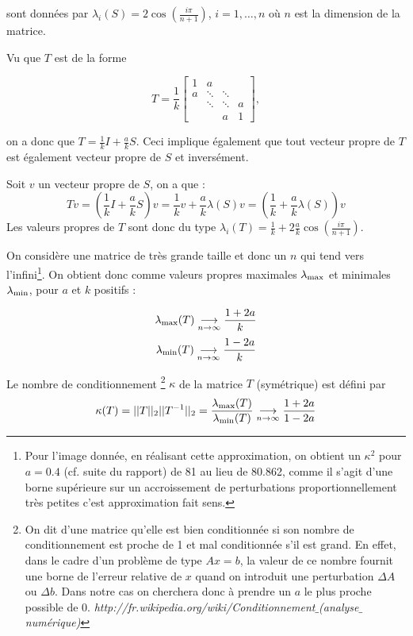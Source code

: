 sont données par $\lambda_i(S) = 2 \cos(\frac{i\pi}{n+1})$, $i= 1, \ldots , n$ où $n$ est la dimension de la matrice.

Vu que $T$ est de la forme

$$
 T = \frac{1}{k}
 \begin{bmatrix}
    1 & a 		& 			& \\
    a & \ddots 	& \ddots 	& \\
      & \ddots 	& \ddots 	& a \\
      & 		& a			& 1
  \end{bmatrix},
$$

on a donc que $T = \frac{1}{k} I + \frac{a}{k} S$. Ceci implique également que tout vecteur propre de $T$ est également vecteur propre de $S$ et inversément.

Soit $v$ un vecteur propre de $S$, on a que :
\begin{equation}
T v = \left( \frac{1}{k} I + \frac{a}{k} S \right) v =
\frac{1}{k} v + \frac{a}{k} \lambda(S) v = \left(\frac{1}{k} + \frac{a}{k} \lambda(S)\right) v
\end{equation}
Les valeurs propres de $T$ sont donc du type $\lambda_i(T) = \frac{1}{k} + 2 \frac{a}{k} \cos(\frac{i\pi}{n+1})$.

On considère une matrice de très grande taille et donc un $n$ qui tend vers l'infini\footnote{ Pour l'image donnée, en réalisant cette approximation, on obtient un $\kappa^2 $ pour $a = 0.4$ (cf. suite du rapport) de  81 au lieu de 80.862, comme il s'agit d'une borne supérieure sur un accroissement de perturbations proportionnellement très petites c'est approximation fait sens.}. 
On obtient donc comme valeurs propres maximales $\lambda_\mathrm{max}$ et minimales $\lambda_\mathrm{min}$,
pour $a$ et $k$ positifs :

$$\lambda_\mathrm{max}(T) \underset{n\rightarrow \infty}{\longrightarrow} \frac{1+2a}{k} $$
$$\lambda_\mathrm{min} (T) \underset{n\rightarrow \infty}{\longrightarrow} \frac{1-2a}{k} $$

Le nombre de conditionnement
\footnote{On dit d'une matrice qu'elle est bien conditionnée si son nombre de conditionnement est proche de 1 et mal conditionnée s'il est grand.
En effet, dans le cadre d'un problème de type $Ax = b$,
la valeur de ce nombre fournit une borne de l'erreur relative de $x$ quand on introduit une perturbation $\Delta A $ ou $\Delta b$.
Dans notre cas on cherchera donc à prendre un $a$ le plus proche possible de 0.
\textit{http://fr.wikipedia.org/wiki/Conditionnement$\_$(analyse$\_$numérique)}}
 $\kappa$ de la matrice $T$ (symétrique) est défini par
\begin{equation}
	\kappa (T) = ||T||_2||T^{-1}||_2 = \frac{\lambda_\mathrm{max} (T)}{\lambda_\mathrm{min} (T)} \underset{n\rightarrow \infty}{\longrightarrow} \frac{1+2a}{1-2a}
\end{equation}

